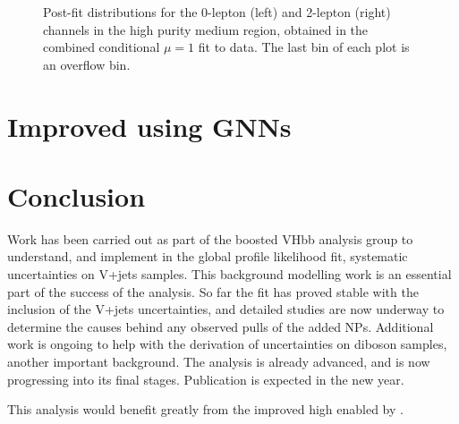 \begin{figure}[!htbp]
\begin{subfigure}{.4\textwidth}
  \end{subfigure}
  \caption{
    Post-fit distributions for the 0-lepton (left) and 2-lepton (right) channels in the high purity medium \pTV region, obtained in the combined conditional $\mu=1$ fit to data. The last bin of each plot is an overflow bin.
  }
  \label{fig:vhbb postfit plots}
\end{figure}





\section{Improved \btagging using GNNs}


\section{Conclusion}

Work has been carried out as part of the boosted VHbb analysis group to understand, and implement in the global profile likelihood fit, systematic uncertainties on V+jets samples. This background modelling work is an essential part of the success of the analysis. So far the fit has proved stable with the inclusion of the V+jets uncertainties, and detailed studies are now underway to determine the causes behind any observed pulls of the added NPs. Additional work is ongoing to help with the derivation of uncertainties on diboson samples, another important background. The analysis is already advanced, and is now progressing into its final stages. Publication is expected in the new year.

This analysis would benefit greatly from the improved high \pt \btagging enabled by \GNN.
